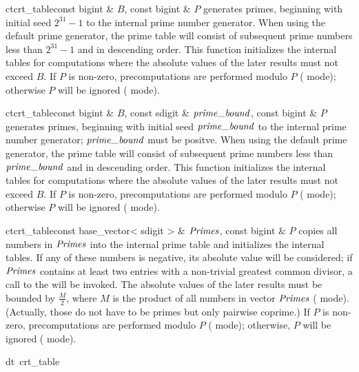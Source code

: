 \begin{fcode}{ct}{crt_table}{const bigint & $B$, const bigint & $P$}
  generates primes, beginning with initial seed $2^{31}-1$ to the internal prime number
  generator.  When using the default prime generator, the prime table will consist of subsequent
  prime numbers less than $2^{31}-1$ and in descending order.  This function initializes the
  internal tables for computations where the absolute values of the later results must not
  exceed $B$.  If $P$ is non-zero, precomputations are performed modulo $P$ (
  mode); otherwise $P$ will be ignored ( mode).
\end{fcode}

\begin{fcode}{ct}{crt_table}{const bigint & $B$, const sdigit & $\primebound$, const bigint & $P$}
  generates primes, beginning with initial seed $\primebound$ to the internal prime number
  generator; $\primebound$ must be positve.  When using the default prime generator, the prime
  table will consist of subsequent prime numbers less than $\primebound$ and in descending
  order.  This function initializes the internal tables for computations where the absolute
  values of the later results must not exceed $B$.  If $P$ is non-zero, precomputations are
  performed modulo $P$ ( mode); otherwise $P$ will be ignored (
  mode).
\end{fcode}

\begin{fcode}{ct}{crt_table}{const base_vector< sdigit > & $\mathit{Primes}$, const bigint & $P$}
  copies all numbers in $\mathit{Primes}$ into the internal prime table and initializes the internal
  tables.  If any of these numbers is negative, its absolute value will be considered; if
  $\mathit{Primes}$ contains at least two entries with a non-trivial greatest common divisor, a call to
  the \LEH will be invoked.  The absolute values of the later results must be bounded by
  $\frac{M}{2}$, where $M$ is the product of all numbers in vector $\mathit{Primes}$ (
  mode).  (Actually, those do not have to be primes but only pairwise coprime.)  If $P$ is
  non-zero, precomputations are performed modulo $P$ ( mode); otherwise, $P$ will
  be ignored ( mode).
\end{fcode}

\begin{fcode}{dt}{~crt_table}{}
\end{fcode}



